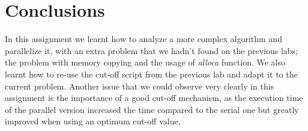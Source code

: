 \section{Conclusions}
\justify
In this assignment we learnt how to analyze a more complex algorithm and parallelize it, with an extra problem that we hadn't found on the previous labs; the problem with memory copying and the usage of \textit{alloca} function. We also learnt how to re-use the cut-off script from the previous lab and adapt it to the current problem.
\justify
Another issue that we could observe very clearly in this assignment is the importance of a good cut-off mechanism, as the execution time of the parallel version increased the time compared to the serial one but greatly improved when using an optimum cut-off value.
